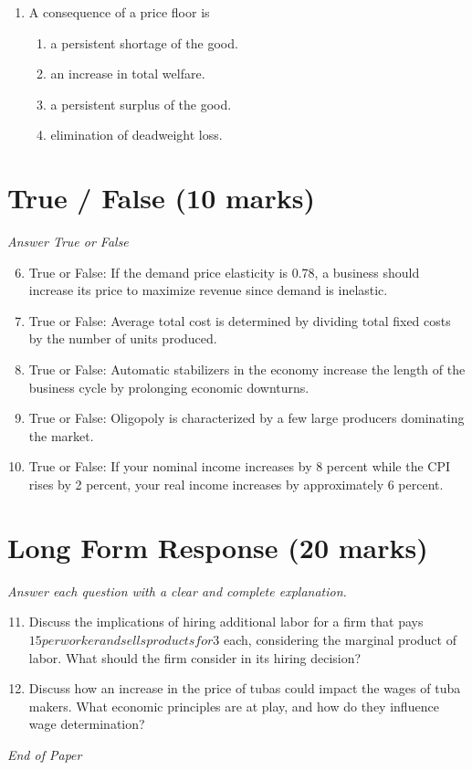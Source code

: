 \documentclass[12pt]{article}
\begin{document}
\begin{enumerate}[label=\arabic*.]
\begin{enumerate}[label=(\alph*)]
    \item Both the price level and real GDP rise.
    \item The price level rises but the change in real GDP is uncertain.
    \item Real GDP rises but the change in the price level is uncertain.
\end{enumerate}
\item A consequence of a price floor is
\begin{enumerate}[label=(\alph*)]
    \item a persistent shortage of the good.
    \item an increase in total welfare.
    \item a persistent surplus of the good.
    \item elimination of deadweight loss.
\end{enumerate}
\end{enumerate}

\section*{True / False (10 marks)}
\textit{Answer True or False}
\begin{enumerate}[label=\arabic*.]
\setcounter{enumi}{5}
\item True or False: If the demand price elasticity is 0.78, a business should increase its price to maximize revenue since demand is inelastic.
\item True or False: Average total cost is determined by dividing total fixed costs by the number of units produced.
\item True or False: Automatic stabilizers in the economy increase the length of the business cycle by prolonging economic downturns.
\item True or False: Oligopoly is characterized by a few large producers dominating the market.
\item True or False: If your nominal income increases by 8 percent while the CPI rises by 2 percent, your real income increases by approximately 6 percent.
\end{enumerate}

\section*{Long Form Response (20 marks)}
\textit{Answer each question with a clear and complete explanation.}
\begin{enumerate}[label=\arabic*.]
\setcounter{enumi}{10}
\item Discuss the implications of hiring additional labor for a firm that pays $15 per worker and sells products for $3 each, considering the marginal product of labor. What should the firm consider in its hiring decision?
\item Discuss how an increase in the price of tubas could impact the wages of tuba makers. What economic principles are at play, and how do they influence wage determination?
\end{enumerate}

\vfill
\noindent\textit{End of Paper}
\end{document}
